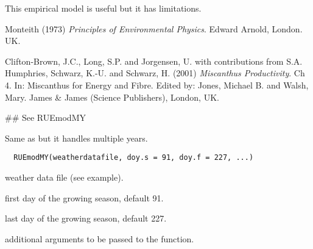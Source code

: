 \documentclass[letterpaper]{book}
\begin{document}
%
\begin{Note}\relax
This empirical model is useful but it has limitations. 
\end{Note}
%
\begin{References}\relax
Monteith (1973) \emph{Principles of Environmental Physics}.
Edward Arnold, London. UK.

Clifton-Brown, J.C., Long, S.P. and Jorgensen, U. with
contributions from S.A. Humphries, Schwarz, K.-U. and
Schwarz, H. (2001) \emph{Miscanthus Productivity}. Ch 4. In:
Miscanthus for Energy and Fibre. Edited by:
Jones, Michael B. and Walsh, Mary. James \& James (Science Publishers),
London, UK.
\end{References}
%
\begin{SeeAlso}\relax
{}
\end{SeeAlso}
%
\begin{Examples}
\begin{ExampleCode}

## See RUEmodMY

\end{ExampleCode}
\end{Examples}
%
\begin{Description}\relax
Same as  but it handles multiple
years.
\end{Description}
%
\begin{Usage}
\begin{verbatim}
  RUEmodMY(weatherdatafile, doy.s = 91, doy.f = 227, ...)
\end{verbatim}
\end{Usage}
%
\begin{Arguments}
\begin{ldescription}
\item[\code{weatherdatafile}] weather data file (see example).

\item[\code{doy.s}] first day of the growing season, default
91.

\item[\code{doy.f}] last day of the growing season, default
227.

\item[\code{...}] additional arguments to be passed to the
 function.
\end{ldescription}
\end{Arguments}
%
\end{document}
